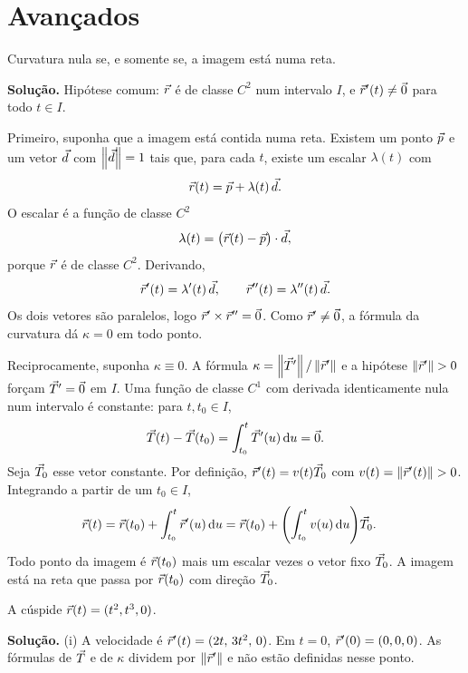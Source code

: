 \documentclass[11pt,a4paper]{article}
\begin{document}
\section{Avançados}

\begin{exercicio}[Avançado --- A1]
Curvatura nula se, e somente se, a imagem está numa reta.
\end{exercicio}

\noindent\textbf{Solução.}
Hipótese comum: \(\vec{r}\) é de classe \(C^2\) num intervalo \(I\), e \(\vec{r}'(t)\neq\vec{0}\) para todo \(t\in I\).

Primeiro, suponha que a imagem está contida numa reta. Existem um ponto \(\vec{p}\) e um vetor \(\vec{d}\) com \(\left\lVert \vec{d} \right\rVert=1\) tais que, para cada \(t\), existe um escalar \(\lambda(t)\) com
\[
\vec{r}(t)=\vec{p}+\lambda(t)\,\vec{d}.
\]
O escalar é a função de classe \(C^2\)
\[
\lambda(t)=\bigl(\vec{r}(t)-\vec{p}\bigr)\cdot\vec{d},
\]
porque \(\vec{r}\) é de classe \(C^2\). Derivando,
\[
\vec{r}'(t)=\lambda'(t)\,\vec{d},
\qquad
\vec{r}''(t)=\lambda''(t)\,\vec{d}.
\]
Os dois vetores são paralelos, logo \(\vec{r}'\times\vec{r}''=\vec{0}\). Como \(\vec{r}'\neq\vec{0}\), a fórmula da curvatura dá \(\kappa=0\) em todo ponto.

Reciprocamente, suponha \(\kappa\equiv 0\). A fórmula \(\kappa=\left\lVert \vec{T}' \right\rVert/\left\lVert \vec{r}' \right\rVert\) e a hipótese \(\left\lVert \vec{r}' \right\rVert>0\) forçam \(\vec{T}'=\vec{0}\) em \(I\). Uma função de classe \(C^1\) com derivada identicamente nula num intervalo é constante: para \(t,t_{0}\in I\),
\[
\vec{T}(t)-\vec{T}(t_{0})
=\int_{t_{0}}^{t}\vec{T}'(u)\,\mathrm{d} u=\vec{0}.
\]
Seja \(\vec{T}_{0}\) esse vetor constante. Por definição, \(\vec{r}'(t)=v(t)\vec{T}_{0}\) com \(v(t)=\left\lVert \vec{r}'(t) \right\rVert>0\). Integrando a partir de um \(t_{0}\in I\),
\begin{align*}
\vec{r}(t)
&=\vec{r}(t_{0})+\int_{t_{0}}^{t}\vec{r}'(u)\,\mathrm{d} u
=\vec{r}(t_{0})+\Biggl(\int_{t_{0}}^{t} v(u)\,\mathrm{d} u\Biggr)\vec{T}_{0}.
\end{align*}
Todo ponto da imagem é \(\vec{r}(t_{0})\) mais um escalar vezes o vetor fixo \(\vec{T}_{0}\). A imagem está na reta que passa por \(\vec{r}(t_{0})\) com direção \(\vec{T}_{0}\).

\begin{exercicio}[Avançado --- A2]
A cúspide \(\vec{r}(t)=(t^{2},t^{3},0)\).
\end{exercicio}

\noindent\textbf{Solução.}
(i) A velocidade é \(\vec{r}'(t)=(2t,\,3t^{2},\,0)\). Em \(t=0\), \(\vec{r}'(0)=(0,0,0)\). As fórmulas de \(\vec{T}\) e de \(\kappa\) dividem por \(\left\lVert \vec{r}' \right\rVert\) e não estão definidas nesse ponto.
\end{document}
